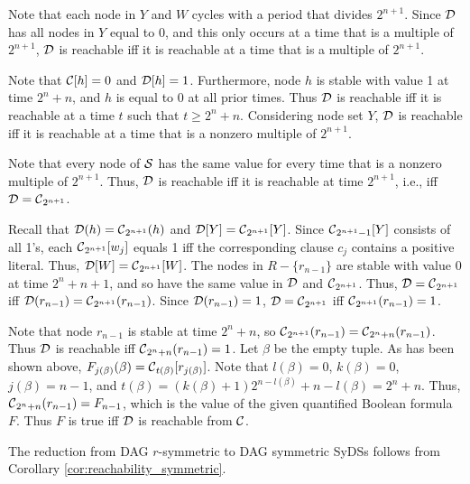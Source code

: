\smallskip

Note that each node in $Y$ and $W$ cycles with a period that divides $2^{n+1}$.
Since $\mbox{$\mathcal{D}$}$ has all nodes in $Y$ equal to 0, 
and this only occurs at a time that is a multiple of $2^{n+1}$,
$\mbox{$\mathcal{D}$}$ is reachable  iff it is reachable at a time that is a multiple of $2^{n+1}$.

Note that $\mbox{$\mathcal{C}$}[h]=0$ and $\mbox{$\mathcal{D}$}[h]=1$.  Furthermore, node $h$ is
stable with value 1 at time $2^n+n$, and $h$ is equal to 0 at all
prior times.  Thus $\mbox{$\mathcal{D}$}$ is reachable iff it is reachable at a
time $t$ such that $t \geq 2^n+n$.  Considering node set $Y$, $\mbox{$\mathcal{D}$}$
is reachable iff it is reachable  at a time that is a nonzero
multiple of $2^{n+1}$.

Note that every node of $\mbox{$\mathcal{S}$}$ 
has the same value for every time that is a  nonzero multiple of $2^{n+1}$.
Thus, $\mbox{$\mathcal{D}$}$ is reachable  iff it is reachable at time $2^{n+1}$,
i.e., iff $\mbox{$\mathcal{D}$} = \mbox{$\mathcal{C}$}_{2^{n+1}}$.

Recall that $\mbox{$\mathcal{D}$}(h) = \mbox{$\mathcal{C}$}_{2^{n+1}}(h)$ and $\mbox{$\mathcal{D}$}[Y] = \mbox{$\mathcal{C}$}_{2^{n+1}}[Y]$.
Since $\mbox{$\mathcal{C}$}_{2^{n+1}-1}[Y]$ consists of all 1's,
each $\mbox{$\mathcal{C}$}_{2^{n+1}}[w_j]$ equals 1 iff the corresponding clause $c_j$ contains a positive literal.
Thus, $\mbox{$\mathcal{D}$}[W] = \mbox{$\mathcal{C}$}_{2^{n+1}}[W]$.
The nodes in $R - \{r_{n-1}\}$ are stable with value 0 at time $2^n+n+1$,
and so have the same value in $\mbox{$\mathcal{D}$}$ and $\mbox{$\mathcal{C}$}_{2^{n+1}}$.
Thus, $\mbox{$\mathcal{D}$} = \mbox{$\mathcal{C}$}_{2^{n+1}}$ iff $\mbox{$\mathcal{D}$}(r_{n-1}) = \mbox{$\mathcal{C}$}_{2^{n+1}}(r_{n-1})$.
Since $\mbox{$\mathcal{D}$}(r_{n-1}) = 1$, $\mbox{$\mathcal{D}$} = \mbox{$\mathcal{C}$}_{2^{n+1}}$ iff
$\mbox{$\mathcal{C}$}_{2^{n+1}}(r_{n-1}) = 1$.

Note that node $r_{n-1}$ is stable at  time $2^n+n$,
so $ \mbox{$\mathcal{C}$}_{2^{n+1}}(r_{n-1}) = \mbox{$\mathcal{C}$}_{2^n+n}(r_{n-1})$.
Thus  $\mbox{$\mathcal{D}$}$ is reachable iff $\mbox{$\mathcal{C}$}_{2^n+n}(r_{n-1}) = 1$.
Let $\beta$ be the empty tuple.
As has been shown above,
$F_{j(\beta)}(\beta) =\mbox{$\mathcal{C}$}_{t(\beta)}[r_{j(\beta)}]$.
Note that $l(\beta) = 0$, $k(\beta) = 0$, $j(\beta) = n-1$,
and $t(\beta) = (k(\beta)+1) 2^{n-l(\beta)} +n -l(\beta) = 2^n+n$. 
Thus, $\mbox{$\mathcal{C}$}_{2^n+n}(r_{n-1}) = F_{n-1}$, which is the value of the given quantified Boolean formula $F$.
Thus $F$ is true iff $\mbox{$\mathcal{D}$}$ is reachable from $\mbox{$\mathcal{C}$}$.

\smallskip

The reduction from DAG $r$-symmetric to DAG symmetric SyDSs 
follows from Corollary \ref{cor:reachability_symmetric}.
\QED
